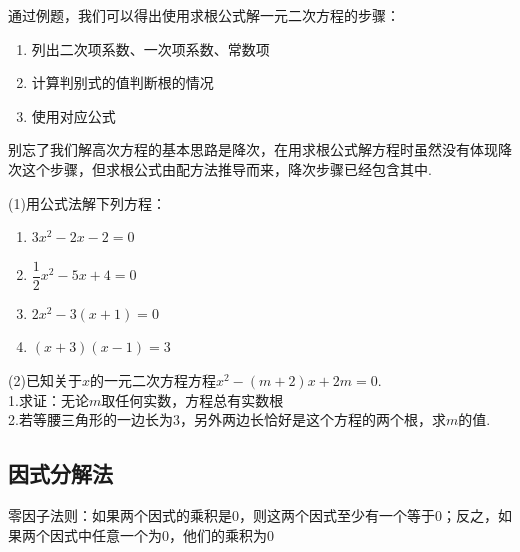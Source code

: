 \documentclass[lang=cn, 10pt, titlestyle=display, oneside, toc=twocol]{elegantbook}
\begin{document}
通过例题，我们可以得出使用求根公式解一元二次方程的步骤：
\begin{enumerate}
    \item 列出二次项系数、一次项系数、常数项
    \item 计算判别式的值判断根的情况
    \item 使用对应公式
\end{enumerate}
\par
别忘了我们解高次方程的基本思路是降次，在用求根公式解方程时虽然没有体现降次这个步骤，但求根公式由配方法推导而来，降次步骤已经包含其中.
\begin{exercise}
\setlength{\parindent}{0pt} %
\setlength{\columnseprule}{0.01pt}
\begin{multicols}{2}
    (1)用公式法解下列方程：
    \begin{enumerate}
        \item \(3x^2-2x-2=0\)
        \item \(\dfrac{1}{2}x^2-5x+4=0\)
        \item \(2x^2-3(x+1)=0\)
        \item \((x+3)(x-1)=3\)
    \end{enumerate}
    (2)已知关于\(x\)的一元二次方程方程\(x^2-(m+2)x+2m=0\).\\
    1.求证：无论\(m\)取任何实数，方程总有实数根\\
    2.若等腰三角形的一边长为3，另外两边长恰好是这个方程的两个根，求\(m\)的值.
\end{multicols}
\end{exercise}

\subsection{因式分解法}

\begin{property}
    零因子法则：如果两个因式的乘积是0，则这两个因式至少有一个等于0；反之，如果两个因式中任意一个为0，他们的乘积为0
\end{property}
\end{document}
